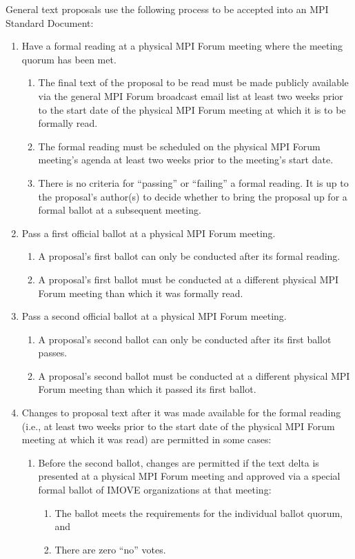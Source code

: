General text proposals use the following process to be accepted into
an MPI Standard Document:

\begin{enumerate}
\item Have a formal reading at a physical MPI Forum meeting where the
  meeting quorum has been met.
  \begin{enumerate}
  \item The final text of the proposal to be read must be made
    publicly available via the general MPI Forum broadcast email list
    at least two weeks prior to the start date of the physical MPI
    Forum meeting at which it is to be formally read.
  \item The formal reading must be scheduled on the physical MPI Forum
    meeting's agenda at least two weeks prior to the meeting's start
    date.
  \item There is no criteria for ``passing'' or ``failing'' a formal
    reading.  It is up to the proposal's author(s) to decide whether
    to bring the proposal up for a formal ballot at a subsequent
    meeting.
  \end{enumerate}

\item Pass a first official ballot at a physical MPI Forum meeting.
  \begin{enumerate}
  \item A proposal's first ballot can only be conducted after its
    formal reading.
  \item A proposal's first ballot must be conducted at a different
    physical MPI Forum meeting than which it was formally read.
  \end{enumerate}

\item Pass a second official ballot at a physical MPI Forum meeting.
  \begin{enumerate}
  \item A proposal's second ballot can only be conducted after its
    first ballot passes.
  \item A proposal's second ballot must be conducted at a different
    physical MPI Forum meeting than which it passed its first ballot.
  \end{enumerate}

\item Changes to proposal text after it was made available for the
  formal reading (i.e., at least two weeks prior to the start date of
  the physical MPI Forum meeting at which it was read) are permitted
  in some cases:
  \begin{enumerate}
  \item Before the second ballot, changes are permitted if the text
    delta is presented at a physical MPI Forum meeting and approved
    via a special formal ballot of IMOVE organizations at that
    meeting:
    \begin{enumerate}
    \item The ballot meets the requirements for the individual
      ballot quorum, and
    \item There are zero ``no'' votes.
    \end{enumerate}


\end{enumerate}
\end{enumerate}
